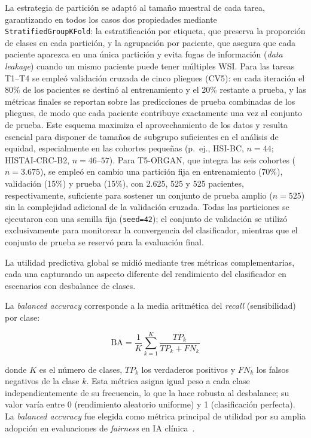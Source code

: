 La estrategia de partición se adaptó al tamaño muestral de cada tarea, garantizando en todos los casos dos propiedades mediante \texttt{StratifiedGroupKFold}: la estratificación por etiqueta, que preserva la proporción de clases en cada partición, y la agrupación por paciente, que asegura que cada paciente aparezca en una única partición y evita fugas de información (\textit{data leakage}) cuando un mismo paciente puede tener múltiples WSI. Para las tareas T1--T4 se empleó validación cruzada de cinco pliegues (CV5): en cada iteración el 80\% de los pacientes se destinó al entrenamiento y el 20\% restante a prueba, y las métricas finales se reportan sobre las predicciones de prueba combinadas de los pliegues, de modo que cada paciente contribuye exactamente una vez al conjunto de prueba. Este esquema maximiza el aprovechamiento de los datos y resulta esencial para disponer de tamaños de subgrupo suficientes en el análisis de equidad, especialmente en las cohortes pequeñas (p.\ ej., HSI-BC, $n=44$; HISTAI-CRC-B2, $n=46$--$57$). Para T5-ORGAN, que integra las seis cohortes ($n=3.675$), se empleó en cambio una partición fija en entrenamiento (70\%), validación (15\%) y prueba (15\%), con 2.625, 525 y 525 pacientes, respectivamente, suficiente para sostener un conjunto de prueba amplio ($n=525$) sin la complejidad adicional de la validación cruzada. Todas las particiones se ejecutaron con una semilla fija (\texttt{seed=42}); el conjunto de validación se utilizó exclusivamente para monitorear la convergencia del clasificador, mientras que el conjunto de prueba se reservó para la evaluación final.

La utilidad predictiva global se midió mediante tres métricas complementarias, cada una capturando un aspecto diferente del rendimiento del clasificador en escenarios con desbalance de clases. 

La \textit{balanced accuracy} corresponde a la media aritmética del \textit{recall} (sensibilidad) por clase:

\begin{equation}
    \text{BA} = \frac{1}{K} \sum_{k=1}^{K} \frac{TP_k}{TP_k + FN_k}
    \label{eq:balanced_accuracy}
\end{equation}

donde $K$ es el número de clases, $TP_k$ los verdaderos positivos y $FN_k$ los falsos negativos de la clase $k$. Esta métrica asigna igual peso a cada clase independientemente de su frecuencia, lo que la hace robusta al desbalance; su valor varía entre 0 (rendimiento aleatorio uniforme) y 1 (clasificación perfecta). La \textit{balanced accuracy} fue elegida como métrica principal de utilidad por su amplia adopción en evaluaciones de \textit{fairness} en IA clínica~\parencite{tertytchny2024balanced}. 

